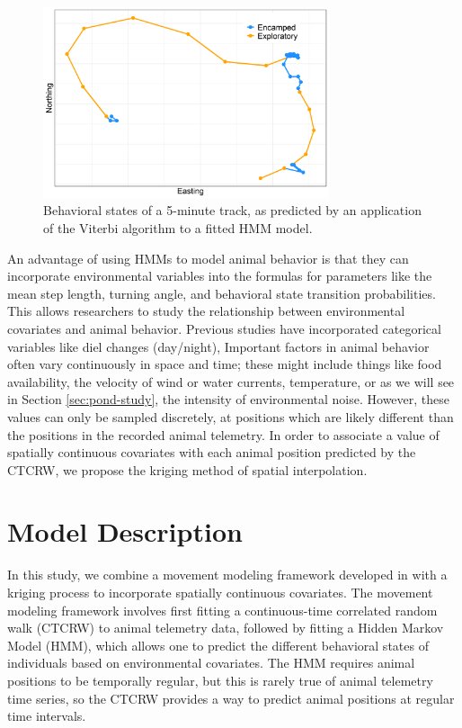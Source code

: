 \documentclass[12pt]{article}
\begin{document}
	\begin{figure}
		\centering
		\includegraphics[width=0.75\textwidth]{track_states.png}
		\caption{Behavioral states of a 5-minute track, as predicted by an application of the Viterbi algorithm to a fitted HMM model.}
		\label{img:track_states}
	\end{figure}
	
	An advantage of using HMMs to model animal behavior is that they can incorporate environmental variables into the formulas for parameters like the mean step length, turning angle, and behavioral state transition probabilities. This allows researchers to study the relationship between environmental covariates and animal behavior. Previous studies have incorporated categorical variables like diel changes (day/night),  Important factors in animal behavior often vary continuously in space and time; these might include things like food availability, the velocity of wind or water currents, temperature, or as we will see in Section \ref{sec:pond-study}, the intensity of environmental noise. However, these values can only be sampled discretely, at positions which are likely different than the positions in the recorded animal telemetry. In order to associate a value of spatially continuous covariates with each animal position predicted by the CTCRW, we propose the kriging method of spatial interpolation.
	
	\section{Model Description} \label{sec:model_description}
	
	In this study, we combine a movement modeling framework developed in \cite{Johnson2008, McClintock2012, Michelot2016, Whoriskey2017, McClintock2018} with a kriging process to incorporate spatially continuous covariates. The movement modeling framework involves first fitting a continuous-time correlated random walk (CTCRW) to animal telemetry data, followed by fitting a Hidden Markov Model (HMM), which allows one to predict the different behavioral states of individuals based on environmental covariates. The HMM requires animal positions to be temporally regular, but this is rarely true of animal telemetry time series, so the CTCRW provides a way to predict animal positions at regular time intervals.
	
\end{document}
